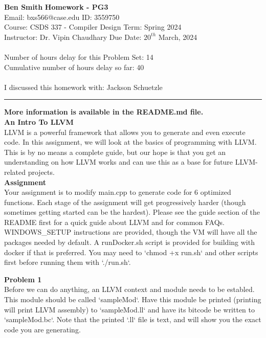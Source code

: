 \documentclass[a4paper, 11pt]{article}
\newenvironment{problem}[2][Problem]
    { \begin{mdframed}[backgroundcolor=gray!20] \textbf{#1 #2} \\}
    {  \end{mdframed}}
\begin{document}
\noindent
\large\textbf{Ben Smith} \hfill \textbf{Homework - PG3}   \\
Email: bxs566@case.edu \hfill ID: 3559750 \\
\normalsize Course: CSDS 337 - Compiler Design \hfill Term: Spring 2024\\
Instructor: Dr. Vipin Chaudhary \hfill Due Date: $20^{th}$ March, 2024 \\ \\
Number of hours delay for this Problem Set: \hfill 14\\
Cumulative number of hours delay so far: \hfill 40 \\ \\
I discussed this homework with: \hfill Jackson Schuetzle \\
\noindent\rule{7in}{2.8pt}

\large\textbf{More information is available in the README.md file. } \\

\large\textbf{An Intro To LLVM} \\
LLVM is a powerful framework that allows you to generate and even execute code. In this assignment, we will look at the basics of programming with LLVM. This is by no means a complete guide, but our hope is that you get an understanding on how LLVM works and can use this as a base for future LLVM-related projects. \\

\large\textbf{Assignment} \\
Your assignment is to modify main.cpp to generate code for 6 optimized functions.
Each stage of the assignment will get progressively harder (though sometimes getting started can be the hardest).
Please see the guide section of the README first for a quick guide about LLVM and for common FAQs.
WINDOWS\_SETUP instructions are provided, though the VM will have all the packages needed by default.
A runDocker.sh script is provided for building with docker if that is preferred.
You may need to `chmod +x run.sh` and other scripts first before running them with `./run.sh`. \\

\begin{problem}{1}
Before we can do anything, an LLVM context and module needs to be establed. This module should be called `sampleMod`. Have this module be printed (printing will print LLVM assembly) to `sampleMod.ll` and have its bitcode be written to `sampleMod.bc`. Note that the printed `.ll` file is text, and will show you the exact code you are generating.

\end{problem}
\end{document}
